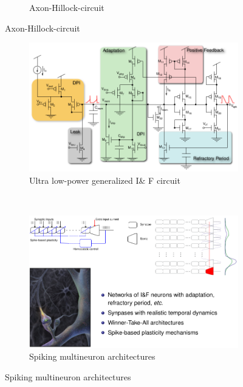 \documentclass[english,11pt]{article}
\begin{document}
\begin{itemize}
\begin{figure}[H]
\begin{subfigure}[b]{0.5\textwidth}
                \caption{Axon-Hillock-circuit}
        \end{subfigure}
\end{figure}
\begin{figure}[H]
        \centering
        \begin{subfigure}[b]{0.5\textwidth}
                \centering
\includegraphics[width=\textwidth]{IanF-circuit.png}
                \caption{Ultra low-power generalized I\& F circuit}
        \end{subfigure}%
        ~
        \begin{subfigure}[b]{0.5\textwidth}
                \centering
\includegraphics[width=\textwidth]{multineuron-circuit.png}
                \caption{Spiking multineuron architectures}
        \end{subfigure}
\end{figure}
\end{itemize}
\end{document}
